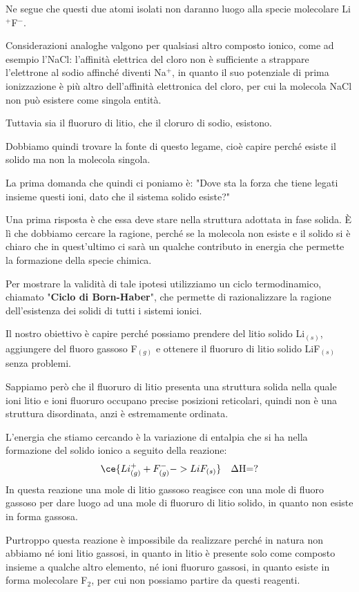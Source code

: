 Ne segue che questi due atomi isolati non daranno luogo alla specie molecolare Li$^+$F$^-$.

Considerazioni analoghe valgono per qualsiasi altro composto ionico, come ad esempio l'NaCl: l'affinità elettrica del cloro non è sufficiente a strappare l'elettrone al sodio affinché diventi Na$^+$, in quanto il suo potenziale di prima ionizzazione è più altro dell'affinità elettronica del cloro, per cui la molecola NaCl non può esistere come singola entità.

Tuttavia sia il fluoruro di litio, che il cloruro di sodio, esistono.

Dobbiamo quindi trovare la fonte di questo legame, cioè capire perché esiste il solido ma non la molecola singola.

La prima domanda che quindi ci poniamo è: "Dove sta la forza che tiene legati insieme questi ioni, dato che il sistema solido esiste?"

Una prima risposta è che essa deve stare nella struttura adottata in fase solida. È lì che dobbiamo cercare la ragione, perché se la molecola non esiste e il solido si è chiaro che in quest'ultimo ci sarà un qualche contributo in energia che permette la formazione della specie chimica.

Per mostrare la validità di tale ipotesi utilizziamo un ciclo termodinamico, chiamato "\textbf{Ciclo di Born-Haber}", che permette di razionalizzare la ragione dell'esistenza dei solidi di tutti i sistemi ionici.

Il nostro obiettivo è capire perché possiamo prendere del litio solido Li$_{(s)}$, aggiungere del fluoro gassoso F$_{(g)}$ e ottenere il fluoruro di litio solido LiF$_{(s)}$ senza problemi.

Sappiamo però che il fluoruro di litio presenta una struttura solida nella quale ioni litio e ioni fluoruro occupano precise posizioni reticolari, quindi non è una struttura disordinata, anzi è estremamente ordinata.

L'energia che stiamo cercando è la variazione di entalpia che si ha nella formazione del solido ionico a seguito della reazione:
$$\ce{Li^{+}_{(g)} + F^{-}_{(g)} -> LiF_{(s)}} \quad \Delta\text{H=?}$$
In questa reazione una mole di litio gassoso reagisce con una mole di fluoro gassoso per dare luogo ad una mole di fluoruro di litio solido, in quanto non esiste in forma gassosa.

Purtroppo questa reazione è impossibile da realizzare perché in natura non abbiamo né ioni litio gassosi, in quanto in litio è presente solo come composto insieme a qualche altro elemento, né ioni fluoruro gassosi, in quanto esiste in forma molecolare F$_2$, per cui non possiamo partire da questi reagenti.


